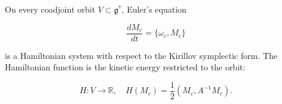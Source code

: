 On every coadjoint orbit $V \subset \mathfrak{g}^*$, Euler's equation

$$\frac{dM_c}{dt} = \{\omega_c, M_c\}$$

is a Hamiltonian system with respect to the Kirillov symplectic form. The Hamiltonian function is the kinetic energy restricted to the orbit:

$$H: V \to \mathbb{R}, \quad H(M_c) = \frac{1}{2}(M_c, A^{-1}M_c).$$
